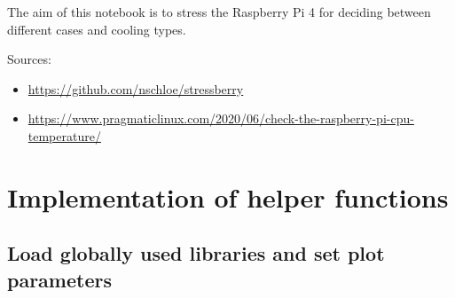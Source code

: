 \documentclass [oneside,10pt,a4paper,ngerman,BCOR10mm,headsepline,parindent,final]{scrartcl}
\providecommand{\tightlist}{%
      \setlength{\itemsep}{0pt}\setlength{\parskip}{0pt}}
\begin{document}
The aim of this notebook is to stress the Raspberry Pi 4 for deciding
between different cases and cooling types.

Sources:

\begin{itemize}
\tightlist
\item
  \url{https://github.com/nschloe/stressberry}
\item
  \url{https://www.pragmaticlinux.com/2020/06/check-the-raspberry-pi-cpu-temperature/}
\end{itemize}

    \hypertarget{implementation-of-helper-functions}{%
\section{Implementation of helper
functions}\label{implementation-of-helper-functions}}

\hypertarget{load-globally-used-libraries-and-set-plot-parameters}{%
\subsection{Load globally used libraries and set plot
parameters}\label{load-globally-used-libraries-and-set-plot-parameters}}
\end{document}
